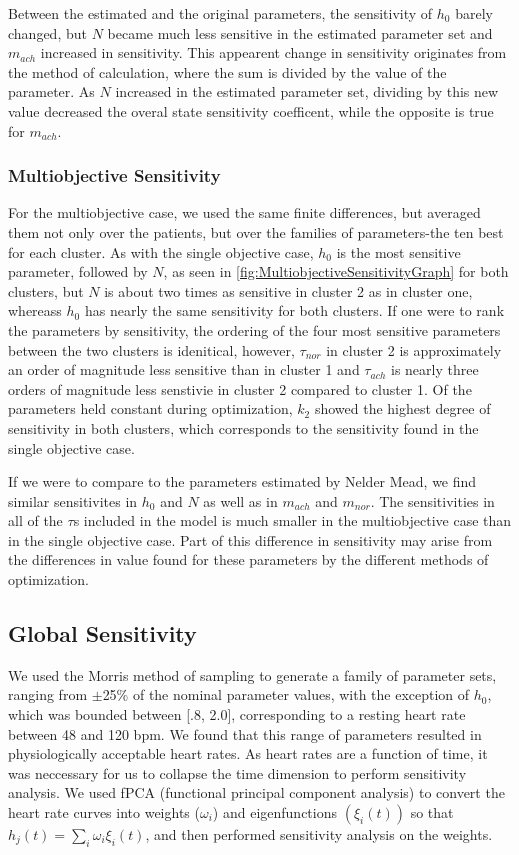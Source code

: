 \documentclass[fleqn,10pt]{wlscirep}
\begin{document}
Between the estimated and the original parameters, the sensitivity of $h_0$ barely changed, but $N$ became much less sensitive in the estimated parameter set and $m_{ach}$ increased in sensitivity. This appearent change in sensitivity originates from the method of calculation, where the sum is divided by the value of the parameter. As $N$ increased in the estimated parameter set, dividing by this new value decreased the overal state sensitivity coefficent, while the opposite is true for $m_{ach}$.
\subsubsection*{Multiobjective Sensitivity} 
For the multiobjective case, we used the same finite differences, but averaged them not only over the patients, but over the families of parameters-the ten best for each cluster. As with the single objective case, $h_0$ is the most sensitive parameter, followed by $N$, as seen in \ref{fig:MultiobjectiveSensitivityGraph} for both clusters, but $N$ is about two times as sensitive in cluster 2 as in cluster one, whereass $h_0$ has nearly the same sensitivity for both clusters. If one were to rank the parameters by sensitivity, the ordering of the four most sensitive parameters between the two clusters is idenitical, however, $\tau_{nor}$ in cluster 2 is approximately an order of magnitude less sensitive than in cluster 1 and $\tau_{ach}$ is nearly three orders of magnitude less senstivie in cluster 2 compared to cluster 1. Of the parameters held constant during optimization, $k_2$ showed the highest degree of sensitivity in both clusters, which corresponds to the sensitivity found in the single objective case.

If we were to compare to the parameters estimated by Nelder Mead, we find similar sensitivites in $h_0$ and $N$ as well as in $m_{ach}$ and $m_{nor}$. The sensitivities in all of the $\tau$s included in the model is much smaller in the multiobjective case than in the single objective case. Part of this difference in sensitivity may arise from the differences in value found for these parameters by the different methods of optimization.

\subsection{Global Sensitivity}
We used the Morris method of sampling to generate a family of parameter sets, ranging from $\pm$25\% of the nominal parameter values, with the exception of $h_0$, which was bounded between [.8, 2.0], corresponding to a resting heart rate between 48 and 120 bpm.\cite{morris1991factorial} We found that this range of parameters resulted in physiologically acceptable heart rates. As heart rates are a function of time, it was neccessary for us to collapse the time dimension to perform sensitivity analysis. We used fPCA (functional principal component analysis) to convert the heart rate curves into weights ($\omega_i$) and eigenfunctions $(\xi_i(t))$ so that $h_j(t)=\sum_i \omega_i \xi_i(t)$, and then performed sensitivity analysis on the weights. \cite{sumner2012methodology}
\end{document}
